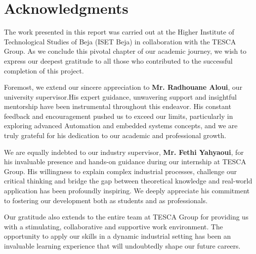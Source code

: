 \chapter*{Acknowledgments}

\vspace{0.5cm}

  \hspace*{0.776cm}The work presented in this report was carried out at the Higher Institute of Technological Studies of Beja (ISET Beja) in collaboration with the TESCA Group. As we conclude this pivotal chapter of our academic journey, we wish to express our deepest gratitude to all those who contributed to the successful completion of this project.

\vspace{0.4cm}
  \hspace*{0.25cm}Foremost, we extend our sincere appreciation to \textbf{Mr. Radhouane Aloui}, our university supervisor.His expert guidance, unwavering support and insightful mentorship have been instrumental throughout this endeavor. His constant feedback and encouragement pushed us to exceed our limits, particularly in exploring advanced Automation and embedded systems concepts, and we are truly grateful for his dedication to our academic and professional growth.
      
\vspace{0.4cm}

  \hspace*{0.25cm}We are equally indebted to our industry supervisor, \textbf{Mr. Fethi Yahyaoui}, for his invaluable presence and hands-on guidance during our internship at TESCA Group. His willingness to explain complex industrial processes, challenge our critical thinking and bridge the gap between theoretical knowledge and real-world application has been profoundly inspiring. We deeply appreciate his commitment to fostering our development both as students and as professionals.

\vspace{0.4cm}

  \hspace*{0.25cm}Our gratitude also extends to the entire team at TESCA Group for providing us with a stimulating, collaborative and supportive work environment. The opportunity to apply our skills in a dynamic industrial setting has been an invaluable learning experience that will undoubtedly shape our future careers.

\vspace{0.4cm}

